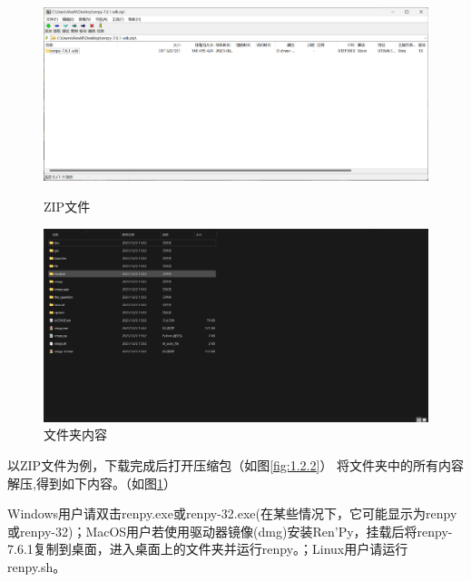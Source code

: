\documentclass[../../Main.tex]{subfiles}
\begin{document}
\begin{figure}[htbp]
    \begin{minipage}{200pt}
        \centering
        \includegraphics[scale=.2]{1.2.2.png}
        \caption{ZIP文件}
        \label{fig:1.2.2}
    \end{minipage}
    \begin{minipage}{180pt}
        \centering
        \includegraphics[scale=.15]{1.2.3.png}
        \caption{文件夹内容}
        \label{fig:1.2.3}
    \end{minipage}
\end{figure}
以ZIP文件为例，下载完成后打开压缩包（如图\ref{fig:1.2.2}）
将文件夹中的所有内容解压,得到如下内容。（如图\ref{fig:1.2.3}）

Windows用户请双击renpy.exe或renpy-32.exe(在某些情况下，它可能显示为renpy或renpy-32)；MacOS用户若使用驱动器镜像(dmg)安装Ren'Py，挂载后将renpy-7.6.1复制到桌面，进入桌面上的文件夹并运行renpy。；Linux用户请运行renpy.sh。
\end{document}
